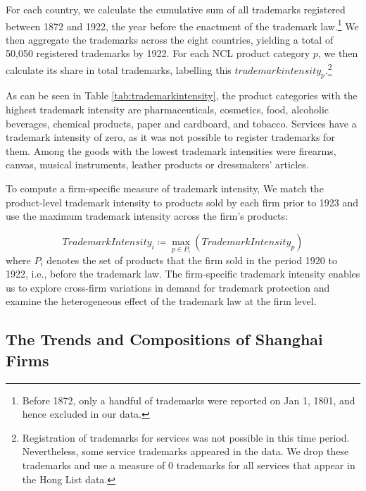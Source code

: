 \documentclass[12pt]{article}
\begin{document}
For each country, we calculate the cumulative sum of all trademarks registered between 1872 and 1922, the year before the enactment of the trademark law.\footnote{Before 1872, only a handful of trademarks were reported on Jan 1, 1801, and hence excluded in our data.} We then aggregate the trademarks across the eight countries, yielding a total of 50,050 registered trademarks by 1922. For each NCL product category $p$, we then calculate its share in total trademarks, labelling this $trademarkintensity_p$.\footnote{Registration of trademarks for services was not possible in this time period. Nevertheless, some service trademarks appeared in the data. We drop these trademarks and use a measure of 0 trademarks for all services that appear in the Hong List data.}

As can be seen in Table \ref{tab:trademarkintensity}, the product categories with the highest trademark intensity are pharmaceuticals, cosmetics, food, alcoholic beverages,  chemical products, paper and cardboard, and tobacco. Services have a trademark intensity of zero, as it was not possible to register trademarks for them. Among the goods with the lowest trademark intensities were firearms, canvas, musical instruments, leather products or dressmakers' articles.  

To compute a firm-specific measure of trademark intensity, We match the product-level trademark intensity to products sold by each firm prior to 1923 and use the maximum trademark intensity across the firm's products: 

\begin{equation*}
Trademark Intensity_i \coloneqq \max_{p \in P_i} \left( TrademarkIntensity_p \right)    
\end{equation*}
 where $P_i $ denotes the set of products that the firm sold in the period 1920 to 1922, i.e., before the trademark law. The firm-specific trademark intensity enables us to explore cross-firm variations in demand for trademark protection and examine the heterogeneous effect of the trademark law at the firm level. 



\subsection{The Trends and Compositions of Shanghai Firms}
\end{document}

